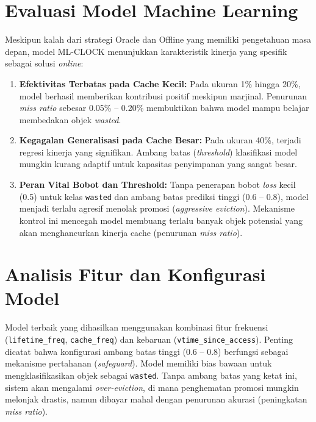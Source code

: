 \section{Evaluasi Model Machine Learning}

Meskipun kalah dari strategi Oracle dan Offline yang memiliki
pengetahuan masa depan,
model ML-CLOCK menunjukkan karakteristik kinerja yang spesifik
sebagai solusi \textit{online}:

\begin{enumerate}
  \item \textbf{Efektivitas Terbatas pada Cache Kecil:}
    Pada ukuran 1\% hingga 20\%, model berhasil memberikan kontribusi positif
    meskipun marjinal. Penurunan \textit{miss ratio} sebesar 0.05\% -- 0.20\%
    membuktikan bahwa model mampu belajar membedakan objek \textit{wasted}.

  \item \textbf{Kegagalan Generalisasi pada Cache Besar:}
    Pada ukuran 40\%, terjadi regresi kinerja yang signifikan.
    Ambang batas (\textit{threshold}) klasifikasi model mungkin kurang adaptif
    untuk kapasitas penyimpanan yang sangat besar.

  \item \textbf{Peran Vital Bobot dan Threshold:}
    Tanpa penerapan bobot \textit{loss} kecil (0.5) untuk kelas \texttt{wasted}
    dan ambang batas prediksi tinggi (0.6 -- 0.8), model menjadi terlalu agresif
    menolak promosi (\textit{aggressive eviction}).
    Mekanisme kontrol ini mencegah model membuang terlalu banyak objek potensial
    yang akan menghancurkan kinerja cache (penurunan \textit{miss ratio}).
\end{enumerate}

\section{Analisis Fitur dan Konfigurasi Model}

Model terbaik yang dihasilkan menggunakan kombinasi fitur frekuensi
(\texttt{lifetime\_freq}, \texttt{cache\_freq}) dan kebaruan
(\texttt{vtime\_since\_access}).
Penting dicatat bahwa konfigurasi ambang batas tinggi (0.6 -- 0.8) berfungsi
sebagai mekanisme pertahanan (\textit{safeguard}).
Model memiliki bias bawaan untuk mengklasifikasikan objek sebagai
\texttt{wasted}.
Tanpa ambang batas yang ketat ini, sistem akan mengalami \textit{over-eviction},
di mana penghematan promosi mungkin melonjak drastis, namun dibayar mahal
dengan penurunan akurasi (peningkatan \textit{miss ratio}).

